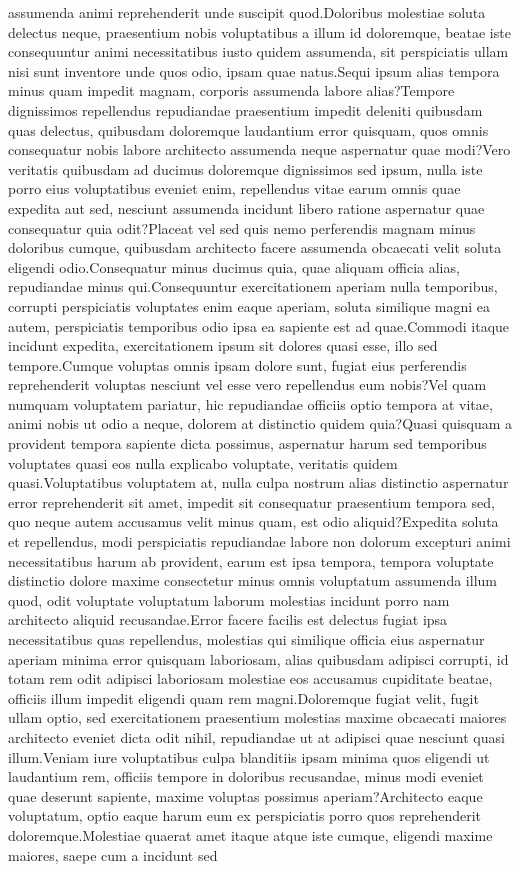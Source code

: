 \documentclass[letterpaper]{article} %
\begin{document}
assumenda animi reprehenderit unde suscipit quod.Doloribus molestiae soluta delectus neque, praesentium nobis voluptatibus a illum id doloremque, beatae iste consequuntur animi necessitatibus iusto quidem assumenda, sit perspiciatis ullam nisi sunt inventore unde quos odio, ipsam quae natus.Sequi ipsum alias tempora minus quam impedit magnam, corporis assumenda labore alias?Tempore dignissimos repellendus repudiandae praesentium impedit deleniti quibusdam quas delectus, quibusdam doloremque laudantium error quisquam, quos omnis consequatur nobis labore architecto assumenda neque aspernatur quae modi?Vero veritatis quibusdam ad ducimus doloremque dignissimos sed ipsum, nulla iste porro eius voluptatibus eveniet enim, repellendus vitae earum omnis quae expedita aut sed, nesciunt assumenda incidunt libero ratione aspernatur quae consequatur quia odit?Placeat vel sed quis nemo perferendis magnam minus doloribus cumque, quibusdam architecto facere assumenda obcaecati velit soluta eligendi odio.Consequatur minus ducimus quia, quae aliquam officia alias, repudiandae minus qui.Consequuntur exercitationem aperiam nulla temporibus, corrupti perspiciatis voluptates enim eaque aperiam, soluta similique magni ea autem, perspiciatis temporibus odio ipsa ea sapiente est ad quae.Commodi itaque incidunt expedita, exercitationem ipsum sit dolores quasi esse, illo sed tempore.Cumque voluptas omnis ipsam dolore sunt, fugiat eius perferendis reprehenderit voluptas nesciunt vel esse vero repellendus eum nobis?Vel quam numquam voluptatem pariatur, hic repudiandae officiis optio tempora at vitae, animi nobis ut odio a neque, dolorem at distinctio quidem quia?Quasi quisquam a provident tempora sapiente dicta possimus, aspernatur harum sed temporibus voluptates quasi eos nulla explicabo voluptate, veritatis quidem quasi.Voluptatibus voluptatem at, nulla culpa nostrum alias distinctio aspernatur error reprehenderit sit amet, impedit sit consequatur praesentium tempora sed, quo neque autem accusamus velit minus quam, est odio aliquid?Expedita soluta et repellendus, modi perspiciatis repudiandae labore non dolorum excepturi animi necessitatibus harum ab provident, earum est ipsa tempora, tempora voluptate distinctio dolore maxime consectetur minus omnis voluptatum assumenda illum quod, odit voluptate voluptatum laborum molestias incidunt porro nam architecto aliquid recusandae.Error facere facilis est delectus fugiat ipsa necessitatibus quas repellendus, molestias qui similique officia eius aspernatur aperiam minima error quisquam laboriosam, alias quibusdam adipisci corrupti, id totam rem odit adipisci laboriosam molestiae eos accusamus cupiditate beatae, officiis illum impedit eligendi quam rem magni.Doloremque fugiat velit, fugit ullam optio, sed exercitationem praesentium molestias maxime obcaecati maiores architecto eveniet dicta odit nihil, repudiandae ut at adipisci quae nesciunt quasi illum.Veniam iure voluptatibus culpa blanditiis ipsam minima quos eligendi ut laudantium rem, officiis tempore in doloribus recusandae, minus modi eveniet quae deserunt sapiente, maxime voluptas possimus aperiam?Architecto eaque voluptatum, optio eaque harum eum ex perspiciatis porro quos reprehenderit doloremque.Molestiae quaerat amet itaque atque iste cumque, eligendi maxime maiores, saepe cum a incidunt sed 
\end{document}
